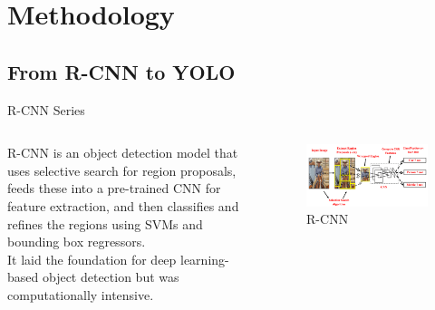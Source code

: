 \section{Methodology}

\subsection{From R-CNN to YOLO}
\begin{frame}{R-CNN Series}
    \begin{columns}
        \begin{column}{0.5\textwidth}
            R-CNN is an object detection model that uses selective search for region proposals, feeds these into a pre-trained CNN for feature extraction, and then classifies and refines the regions using SVMs and bounding box regressors. \\
            \bigskip
            It laid the foundation for deep learning-based object detection but was computationally intensive.

        \end{column}
        \begin{column}{0.5\textwidth}
            \begin{figure}[h]
                \centering
                \includegraphics[width=\textwidth]{images/rcnn.png}
                \caption{R-CNN}
                \label{fig:rcnn}
            \end{figure}
        \end{column}
    \end{columns}
\end{frame}

